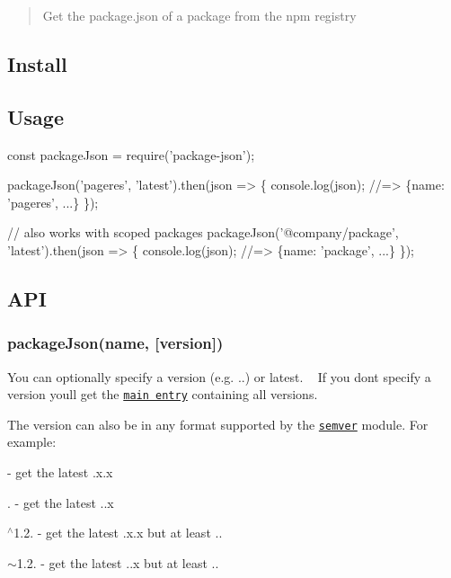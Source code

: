 \begin{quote}
Get the package.\+json of a package from the npm registry \end{quote}


\subsection*{Install}




\subsection*{Usage}


\begin{DoxyCode}
const packageJson = require('package-json');

packageJson('pageres', 'latest').then(json => \{
    console.log(json);
    //=> \{name: 'pageres', ...\}
\});

// also works with scoped packages
packageJson('@company/package', 'latest').then(json => \{
    console.log(json);
    //=> \{name: 'package', ...\}
\});
\end{DoxyCode}


\subsection*{A\+PI}

\subsubsection*{package\+Json(name, \mbox{[}version\mbox{]})}

You can optionally specify a version (e.\+g. {..}) or {\ttfamily latest}. ~\newline
If you don\textquotesingle{}t specify a version you\textquotesingle{}ll get the \href{http://registry.npmjs.org/pageres/}{\tt main entry} containing all versions.

The version can also be in any format supported by the \href{https://www.npmjs.com/package/semver}{\tt semver} module. For example\+:


\begin{DoxyItemize}
\item {} -\/ get the latest {.\+x.\+x}
\item {.} -\/ get the latest {..\+x}
\item {\ttfamily $^\wedge$1.2.} -\/ get the latest {.\+x.\+x} but at least {..}
\item {\ttfamily $\sim$1.2.} -\/ get the latest {..\+x} but at least {..}
\end{DoxyItemize}

